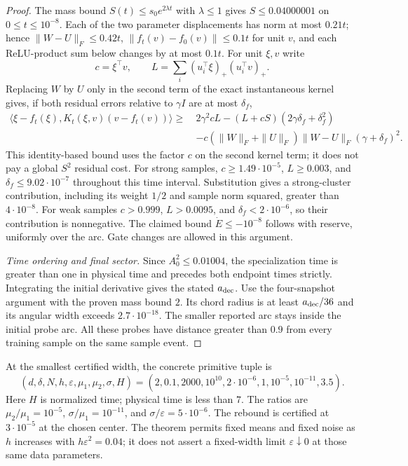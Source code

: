 \documentclass[11pt]{article}
\theoremstyle{remark}
\begin{document}
\begin{proof}
The mass bound $S(t)\le s_0e^{2\lambda t}$ with $\lambda\le1$
gives $S\le0.04000001$ on $0\le t\le10^{-8}$.
Each of the two parameter displacements has norm at most $0.21t$;
hence $\|W-U\|_F\le0.42t$, $\|f_t(v)-f_0(v)\|\le0.1t$ for unit $v$,
and each ReLU-product sum below changes by at most $0.1t$.
For unit $\xi,v$ write
\[
 c=\xi^\top v,\qquad
 L=\sum_i(u_i^\top\xi)_+(u_i^\top v)_+.
\]
Replacing $W$ by $U$ only in the second term of the exact instantaneous
kernel gives, if both residual errors relative to $\gamma I$ are at most
$\delta_f$,
\begin{align*}
 \langle\xi-f_t(\xi),K_t(\xi,v)(v-f_t(v))\rangle
 \ge\ &2\gamma^2cL-(L+cS)(2\gamma\delta_f+\delta_f^2)\\
 &-c(\|W\|_F+\|U\|_F)\|W-U\|_F(\gamma+\delta_f)^2.
\end{align*}
This identity-based bound uses the factor $c$ on the second kernel term;
it does not pay a global $S^2$ residual cost.
For strong samples, $c\ge1.49\cdot10^{-5}$, $L\ge0.003$, and
$\delta_f\le9.02\cdot10^{-7}$ throughout this time interval. Substitution
gives a strong-cluster contribution, including its weight $1/2$ and
sample norm squared, greater than $4\cdot10^{-8}$.
For weak samples $c>0.999$, $L>0.0095$, and
$\delta_f<2\cdot10^{-6}$, so their contribution is nonnegative.
The claimed bound $\dot E\le-10^{-8}$ follows with reserve, uniformly
over the arc. Gate changes are allowed in this argument.

\emph{Time ordering and final sector.}
Since $A_0^2\le0.01004$, the specialization time is greater than one
in physical time and precedes both endpoint times strictly.
Integrating the initial derivative gives the stated $a_{\rm dec}$.
Use the four-snapshot argument with the proven mass bound $2$.
Its chord radius is at least $a_{\rm dec}/36$ and its angular width
exceeds $2.7\cdot10^{-18}$. The smaller reported arc stays inside the
initial probe arc. All these probes have distance greater than $0.9$
from every training sample on the same sample event.
\end{proof}

At the smallest certified width, the concrete primitive tuple is
\[
 (d,\delta,N,h,\varepsilon,\mu_1,\mu_2,\sigma,H)
 =(2,0.1,2000,10^{10},2\cdot10^{-6},1,10^{-5},10^{-11},3.5).
\]
Here $H$ is normalized time; physical time is less than $7$.
The ratios are $\mu_2/\mu_1=10^{-5}$,
$\sigma/\mu_1=10^{-11}$, and $\sigma/\varepsilon=5\cdot10^{-6}$.
The rebound is certified at $3\cdot10^{-5}$ at the chosen center.
The theorem permits fixed means and fixed noise as $h$ increases with
$h\varepsilon^2=0.04$; it does not assert a fixed-width limit
$\varepsilon\downarrow0$ at those same data parameters.
\end{document}
